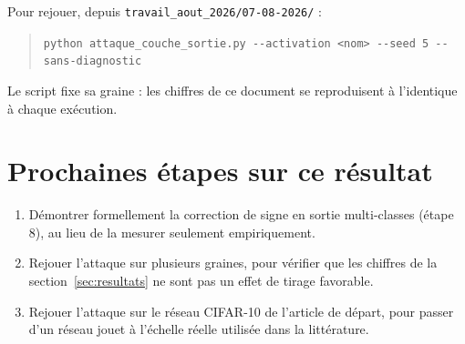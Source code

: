 \documentclass[11pt]{article}
\begin{document}
Pour rejouer, depuis \texttt{travail\_aout\_2026/07-08-2026/} :

\begin{quote}
\verb|python attaque_couche_sortie.py --activation <nom> --seed 5 --sans-diagnostic|
\end{quote}

Le script fixe sa graine : les chiffres de ce document se reproduisent à
l'identique à chaque exécution.

\section{Prochaines étapes sur ce résultat}

\begin{enumerate}
  \item Démontrer formellement la correction de signe en sortie
    multi-classes (étape 8), au lieu de la mesurer seulement
    empiriquement.
  \item Rejouer l'attaque sur plusieurs graines, pour vérifier que les
    chiffres de la section~\ref{sec:resultats} ne sont pas un effet de
    tirage favorable.
  \item Rejouer l'attaque sur le réseau CIFAR-10 de l'article de départ, pour
    passer d'un réseau jouet à l'échelle réelle utilisée dans la
    littérature.
\end{enumerate}
\end{document}
